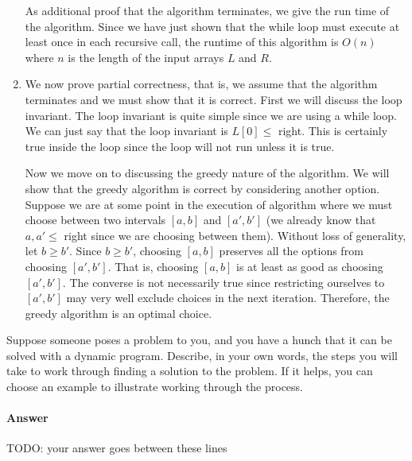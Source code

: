 \documentclass{article}
\begin{document}
\begin{enumerate}
    As additional proof that the algorithm terminates, we give the run time of the algorithm.
    Since we have just shown that the while loop must execute at least once in each recursive call, the runtime of this algorithm is $O(n)$ where $n$ is the length of the input arrays $L$ and $R$.
    \item We now prove partial correctness, that is, we assume that the algorithm terminates and we must show that it is correct.
    First we will discuss the loop invariant.
    The loop invariant is quite simple since we are using a while loop.
    We can just say that the loop invariant is $L[0] \leq$ right.
    This is certainly true inside the loop since the loop will not run unless it is true.

    Now we move on to discussing the greedy nature of the algorithm.
    We will show that the greedy algorithm is correct by considering another option.
    Suppose we are at some point in the execution of algorithm where we must choose between two intervals $[a,b]$ and $[a',b']$ (we already know that $a,a' \leq $ right since we are choosing between them).
    Without loss of generality, let $b \geq b'$.
    Since $b \geq b'$, choosing $[a,b]$ preserves all the options from choosing $[a',b']$.
    That is, choosing $[a,b]$ is at least as good as choosing $[a',b']$.
    The converse is not necessarily true since restricting ourselves to $[a',b']$ may very well exclude choices in the next iteration.
    Therefore, the greedy algorithm is an optimal choice.
\end{enumerate}


\nextprob
{}

Suppose someone poses a problem to you, and you have a hunch that it can be
solved with a dynamic program.  Describe, in your own words, the steps you will
take to work through finding a solution to the problem.  If it helps, you can
choose an example to illustrate working through the process.

\paragraph{Answer}


TODO: your answer goes between these lines

\end{document}
